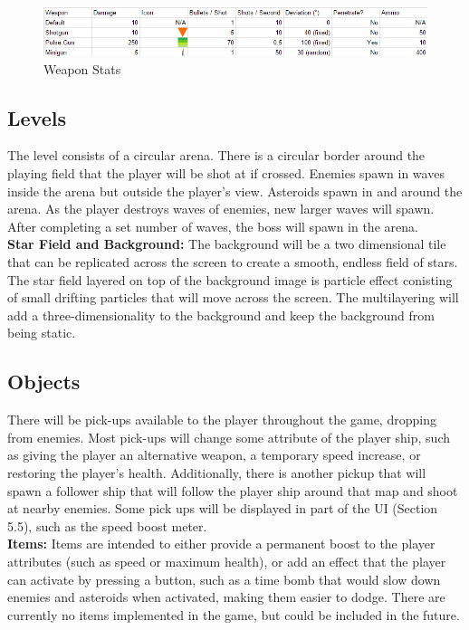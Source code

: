 \documentclass[12pt]{article}       %
\def\hs{\hspace{15pt}}
\begin{document}
\begin{figure} [H]
\includegraphics[width=6in]{stats.png}
\centering
\caption{Weapon Stats} \label{stats}
\end{figure}

\subsection{Levels} %

	\hs {\bf Level design:} The level consists of a circular arena. There is a circular border around the playing field that the player will be shot at if crossed. Enemies spawn in waves inside the arena but outside the player's view. Asteroids spawn in and around the arena. As the player destroys waves of enemies, new larger waves will spawn. After completing a set number of waves, the boss will spawn in the arena. \\

	{\bf Star Field and Background:} The background will be a two dimensional tile that can be replicated across the screen to create a smooth, endless field of stars. The star field layered on top of the background image is particle effect conisting of small drifting particles that will move across the screen. The multilayering will add a three-dimensionality to the background and keep the background from being static. 

\subsection{Objects} %

	\hs {\bf Pick-ups:}  There will be pick-ups available to the player throughout the game, dropping from enemies. Most pick-ups will change some attribute of the player ship, such as giving the player an alternative weapon, a temporary speed increase, or restoring the player's health. Additionally, there is another pickup that will spawn a follower ship that will follow the player ship around that map and shoot at nearby enemies. Some pick ups will be displayed in part of the UI (Section 5.5), such as the speed boost meter. \\

	{\bf  Items:} Items are intended to either provide a permanent boost to the player attributes (such as speed or maximum health), or add an effect that the player can activate by pressing a button, such as a time bomb that would slow down enemies and asteroids when activated, making them easier to dodge. There are currently no items implemented in the game, but could be included in the future. \\
\end{document}
